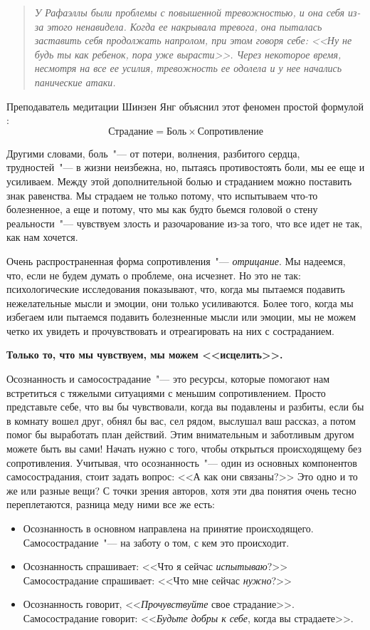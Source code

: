\begin{quotation}
	\textit{
		У Рафаэллы были проблемы с повышенной тревожностью, и она себя из-за этого ненавидела. Когда ее накрывала тревога, она пыталась заставить себя продолжать напролом, при этом говоря себе: <<Ну не будь ты как ребенок, пора уже вырасти>>. Через некоторое время, несмотря на все ее усилия, тревожность ее одолела и у нее начались панические атаки.
	}
\end{quotation}
	
Преподаватель медитации Шинзен Янг объяснил этот феномен простой формулой \cite{60}:
{\large \textbf{\[\text{Страдание} = \text{Боль} \times \text{Сопротивление}\]}}

Другими словами, боль~"--- от потери, волнения, разбитого сердца, трудностей~"--- в жизни неизбежна, но, пытаясь противостоять боли, мы ее еще и усиливаем\cite{61}. Между этой дополнительной болью и страданием можно поставить знак равенства. Мы страдаем не только потому, что испытываем что-то болезненное, а еще и потому, что мы как будто бьемся головой о стену реальности~"--- чувствуем злость и разочарование из-за того, что все идет не так, как нам хочется.

Очень распространенная форма сопротивления~"--- \textit{отрицание}. Мы надеемся, что, если не будем думать о проблеме, она исчезнет. Но это не так: психологические исследования показывают, что, когда мы пытаемся подавить нежелательные мысли и эмоции, они только усиливаются\cite{62}. Более того, когда мы избегаем или пытаемся подавить болезненные мысли или эмоции, мы не можем четко их увидеть и прочувствовать и отреагировать на них с состраданием. 

\begin{center}
	{\large \textbf{Только то, что мы чувствуем, мы можем <<исцелить>>.}}
\end{center}

Осознанность и самосострадание~"--- это ресурсы, которые помогают нам встретиться с тяжелыми ситуациями с меньшим сопротивлением. Просто представьте себе, что вы бы чувствовали, когда вы подавлены и разбиты, если бы в комнату вошел друг, обнял бы вас, сел рядом, выслушал ваш рассказ, а потом помог бы выработать план действий. Этим внимательным и заботливым другом можете быть вы сами! Начать нужно с того, чтобы открыться происходящему без сопротивления. 
Учитывая, что осознанность~"--- один из основных компонентов самосострадания, стоит задать вопрос: <<А как они связаны?>> Это одно и то же или разные вещи?
С точки зрения авторов, хотя эти два понятия очень тесно переплетаются, разница меду ними все же есть:
\begin{itemize}
	\item Осознанность в основном направлена на принятие происходящего. Самосострадание~"--- на заботу о том, с кем это происходит.
	\item Осознанность спрашивает: <<Что я сейчас \emph{испытываю}?>> Самосострадание спрашивает: <<Что мне сейчас \emph{нужно}?>> 
	\item Осознанность говорит, <<\emph{Прочувствуйте} свое страдание>>.  Самосострадание говорит: <<\emph{Будьте добры к себе}, когда вы страдаете>>.
\end{itemize}

